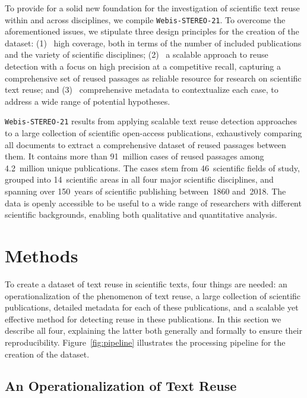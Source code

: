 \documentclass[fleqn,10pt]{wlscirep}
\newcommand{\Ni}{(1)~}
\newcommand{\Nii}{(2)~}
\newcommand{\Niii}{(3)~}
\newcommand{\webisReuseCorpus}{\texttt{Webis-STEREO-21}\xspace}
\begin{document}
To provide for a solid new foundation for the investigation of scientific text reuse within and across disciplines, we compile \webisReuseCorpus. To overcome the aforementioned issues, we stipulate three design principles for the creation of the dataset:
\Ni
high coverage, both in terms of the number of included publications and the variety of scientific disciplines;
\Nii
a scalable approach to reuse detection with a focus on high precision at a competitive recall, capturing a comprehensive set of reused passages as reliable resource for research on scientific text reuse; and 
\Niii
comprehensive metadata to contextualize each case, to address a wide range of potential hypotheses.

\webisReuseCorpus results from applying scalable text reuse detection approaches to a large collection of scientific open-access publications, exhaustively comparing all documents to extract a comprehensive dataset of reused passages between them. It contains more than 91~million cases of reused passages among 4.2~million unique publications. The cases stem from 46~scientific fields of study, grouped into 14~scientific areas in all four major scientific disciplines, and spanning over 150~years of scientific publishing between~1860 and~2018. The data is openly accessible to be useful to a wide range of researchers with different scientific backgrounds, enabling both qualitative and quantitative analysis.

\section*{Methods}
\label{sec:method}

To create a dataset of text reuse in scientific texts, four things are needed: an operationalization of the phenomenon of text reuse, a large collection of scientific publications, detailed metadata for each of these publications, and a scalable yet effective method for detecting reuse in these publications. In this section we describe all four, explaining the latter both generally and formally to ensure their reproducibility. Figure~\ref{fig:pipeline} illustrates the processing pipeline for the creation of the dataset. 


\subsection*{An Operationalization of Text Reuse}
\end{document}
